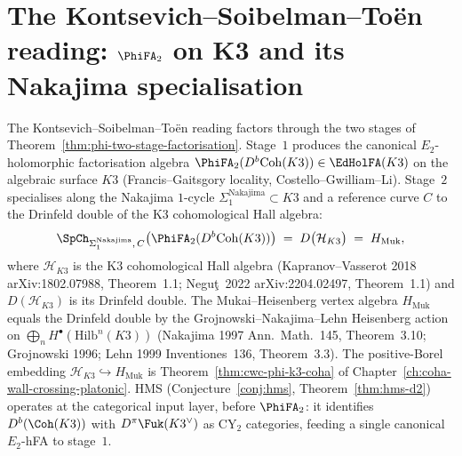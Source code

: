 \section{The Kontsevich--Soibelman--To\"en reading: \texorpdfstring{$\PhiFA_2$}{PhiFA-2} on K3 and its Nakajima specialisation}
\label{sec:dcy-kst-phi2-k3-coha}

\begin{remark}
\label{rem:dcy-kst-phi2-k3-coha}
The Kontsevich--Soibelman--To\"en reading factors through the two stages of Theorem~\ref{thm:phi-two-stage-factorisation}. Stage~$1$ produces the canonical $E_2$-holomorphic factorisation algebra $\PhiFA_2(D^b\mathrm{Coh}(K3)) \in \EdHolFA(K3)$ on the algebraic surface $K3$ (Francis--Gaitsgory locality, Costello--Gwilliam--Li). Stage~$2$ specialises along the Nakajima $1$-cycle $\Sigma_1^{\mathrm{Nakajima}} \subset K3$ and a reference curve $C$ to the Drinfeld double of the K3 cohomological Hall algebra:
\[
 \SpCh_{\Sigma_1^{\mathrm{Nakajima}},\, C}\bigl(\PhiFA_2(D^b\mathrm{Coh}(K3))\bigr)
 \;=\; D\bigl(\mathcal{H}_{K3}\bigr)
 \;=\; H_{\mathrm{Muk}},
\]
where $\mathcal{H}_{K3}$ is the K3 cohomological Hall algebra
(Kapranov--Vasserot 2018 \textup{arXiv:1802.07988}, Theorem~1.1;
Negu\c{t}~2022 \textup{arXiv:2204.02497}, Theorem~1.1) and
$D(\mathcal{H}_{K3})$ is its Drinfeld double. The Mukai--Heisenberg vertex
algebra $H_{\mathrm{Muk}}$ equals the Drinfeld double by the
Grojnowski--Nakajima--Lehn Heisenberg action on
$\bigoplus_n H^\bullet(\mathrm{Hilb}^n(K3))$ (Nakajima 1997
\textup{Ann.~Math.}~145, Theorem~3.10; Grojnowski 1996; Lehn 1999
\textup{Inventiones}~136, Theorem~3.3). The positive-Borel embedding
$\mathcal{H}_{K3}\hookrightarrow H_{\mathrm{Muk}}$ is
Theorem~\ref{thm:cwc-phi-k3-coha} of
Chapter~\ref{ch:coha-wall-crossing-platonic}. HMS (Conjecture~\ref{conj:hms}, Theorem~\ref{thm:hms-d2}) operates at the categorical input layer, before $\PhiFA_2$: it identifies $D^b(\Coh(K3))$ with $D^\pi\Fuk(K3^\vee)$ as CY$_2$ categories, feeding a single canonical $E_2$-hFA to stage~$1$.
\end{remark}

